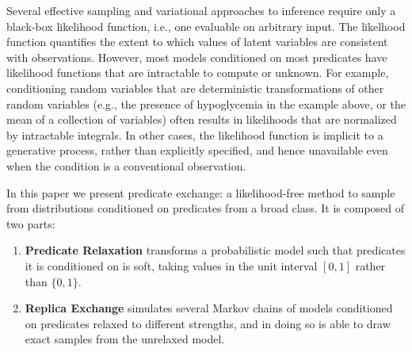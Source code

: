 



Several effective sampling  \citep{andrieu2003introduction} and variational  \citep{jordan1999introduction, ranganath2014black} approaches to inference require only a black-box likelihood function, i.e., one evaluable on arbitrary input.
The likelhood function quantifies the extent to which values of latent variables are consistent with observations. 
However, most models conditioned on most predicates have likelihood functions that are intractable to compute or unknown.
For example, conditioning random variables that are deterministic transformations of other random variables (e.g., the presence of hypoglycemia in the example above, or the mean of a collection of variables) often results in likelihoods that are normalized by intractable integrals.	
In other cases, the likelihood function is implicit to a generative process, rather than explicitly specified, and hence unavailable even when the condition is a conventional observation.

In this paper we present predicate exchange:
a likelihood-free method to sample from distributions conditioned on predicates from a broad class.
It is composed of two parts:
\begin{enumerate}
\item \textbf{Predicate Relaxation} transforms a probabilistic model such that predicates it is conditioned on is soft, taking values in the unit interval $[0, 1]$ rather  than $\{0, 1\}$.
\item  \textbf{Replica Exchange} simulates several Markov chains of models conditioned on predicates relaxed to different strengths, and in doing so is able to draw exact samples from the unrelaxed model. 
\end{enumerate}

